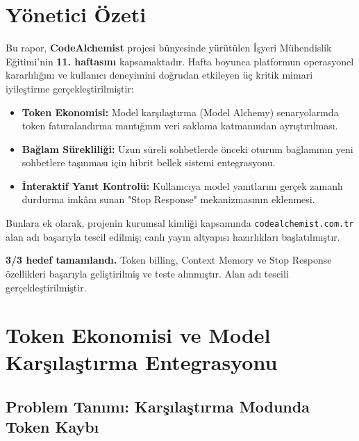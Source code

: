 \documentclass[12pt,a4paper]{article}
\begin{document}
\newpage
\tableofcontents
\newpage

\section{Yönetici Özeti}

Bu rapor, \textbf{CodeAlchemist} projesi bünyesinde yürütülen İşyeri Mühendislik Eğitimi'nin \textbf{11. haftasını} kapsamaktadır. Hafta boyunca platformun operasyonel kararlılığını ve kullanıcı deneyimini doğrudan etkileyen üç kritik mimari iyileştirme gerçekleştirilmiştir:

\begin{itemize}[leftmargin=2em, itemsep=4pt]
    \item \textbf{Token Ekonomisi:} Model karşılaştırma (Model Alchemy) senaryolarında token faturalandırma mantığının veri saklama katmanından ayrıştırılması.
    \item \textbf{Bağlam Sürekliliği:} Uzun süreli sohbetlerde önceki oturum bağlamının yeni sohbetlere taşınması için hibrit bellek sistemi entegrasyonu.
    \item \textbf{İnteraktif Yanıt Kontrolü:} Kullanıcıya model yanıtlarını gerçek zamanlı durdurma imkânı sunan "Stop Response" mekanizmasının eklenmesi.
\end{itemize}

Bunlara ek olarak, projenin kurumsal kimliği kapsamında \texttt{codealchemist.com.tr} alan adı başarıyla tescil edilmiş; canlı yayın altyapısı hazırlıkları başlatılmıştır.

\begin{successbox}
\textbf{3/3 hedef tamamlandı.} Token billing, Context Memory ve Stop Response özellikleri başarıyla geliştirilmiş ve teste alınmıştır. Alan adı tescili gerçekleştirilmiştir.
\end{successbox}

\section{Token Ekonomisi ve Model Karşılaştırma Entegrasyonu}

\subsection{Problem Tanımı: Karşılaştırma Modunda Token Kaybı}
\end{document}
